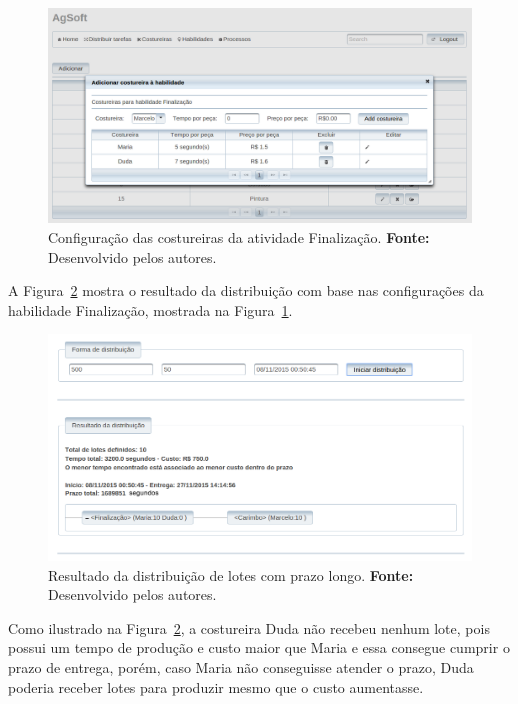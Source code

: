 \begin{figure}[h!]
	\centerline{\includegraphics[width=14.7cm]{./imagens/cofiguracao_habilidade_teste3.png}}
	\caption[Configuração das costureiras da atividade Finalização.]
	{Configuração das costureiras da atividade Finalização. \textbf{Fonte:}
	Desenvolvido pelos autores.}
	\label{fig:configuracao_habilidade_costureira_teste3}
\end{figure}


\par A Figura~\ref{fig:resultado1_teste3} mostra o resultado da distribuição
com base nas configurações da habilidade Finalização, mostrada na
Figura~\ref{fig:configuracao_habilidade_costureira_teste3}.

\begin{figure}[h!]
	\centerline{\includegraphics[width=13cm]{./imagens/resultado1_teste3.png}}
	\caption[Resultado da distribuição de lotes com prazo longo.]
	{Resultado da distribuição de lotes com prazo longo. \textbf{Fonte:} Desenvolvido pelos
	autores.}
	\label{fig:resultado1_teste3}
\end{figure}

\par Como ilustrado na Figura~\ref{fig:resultado1_teste3}, a costureira Duda
não recebeu nenhum lote, pois possui um tempo de produção e custo maior que
Maria e essa consegue cumprir o prazo de entrega, porém, caso Maria não
conseguisse atender o prazo, Duda poderia receber lotes para produzir mesmo que
o custo aumentasse.

